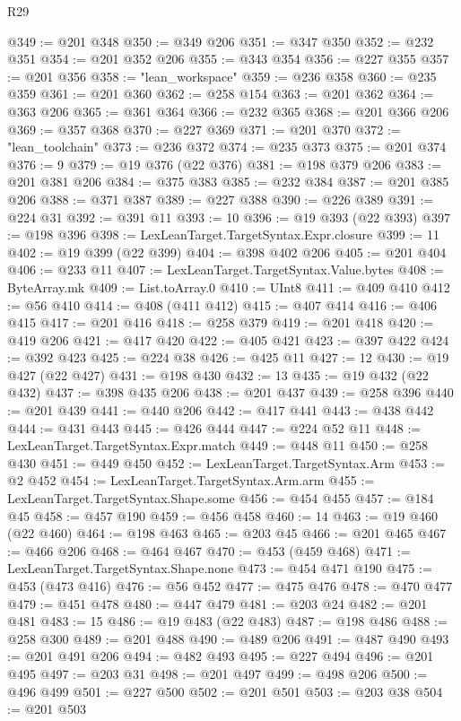 \begin{lexlean}{R29}
\begin{coremodule}
@349 := @201 @348
@350 := @349 @206
@351 := @347 @350
@352 := @232 @351
@354 := @201 @352 @206
@355 := @343 @354
@356 := @227 @355
@357 := @201 @356
@358 := "lean_workspace"
@359 := @236 @358
@360 := @235 @359
@361 := @201 @360
@362 := @258 @154
@363 := @201 @362
@364 := @363 @206
@365 := @361 @364
@366 := @232 @365
@368 := @201 @366 @206
@369 := @357 @368
@370 := @227 @369
@371 := @201 @370
@372 := "lean_toolchain"
@373 := @236 @372
@374 := @235 @373
@375 := @201 @374
@376 := 9
@379 := @19 @376 (@22 @376)
@381 := @198 @379 @206
@383 := @201 @381 @206
@384 := @375 @383
@385 := @232 @384
@387 := @201 @385 @206
@388 := @371 @387
@389 := @227 @388
@390 := @226 @389
@391 := @224 @31
@392 := @391 @11
@393 := 10
@396 := @19 @393 (@22 @393)
@397 := @198 @396
@398 := LexLeanTarget.TargetSyntax.Expr.closure
@399 := 11
@402 := @19 @399 (@22 @399)
@404 := @398 @402 @206
@405 := @201 @404
@406 := @233 @11
@407 := LexLeanTarget.TargetSyntax.Value.bytes
@408 := ByteArray.mk
@409 := List.toArray.{0}
@410 := UInt8
@411 := @409 @410
@412 := @56 @410
@414 := @408 (@411 @412)
@415 := @407 @414
@416 := @406 @415
@417 := @201 @416
@418 := @258 @379
@419 := @201 @418
@420 := @419 @206
@421 := @417 @420
@422 := @405 @421
@423 := @397 @422
@424 := @392 @423
@425 := @224 @38
@426 := @425 @11
@427 := 12
@430 := @19 @427 (@22 @427)
@431 := @198 @430
@432 := 13
@435 := @19 @432 (@22 @432)
@437 := @398 @435 @206
@438 := @201 @437
@439 := @258 @396
@440 := @201 @439
@441 := @440 @206
@442 := @417 @441
@443 := @438 @442
@444 := @431 @443
@445 := @426 @444
@447 := @224 @52 @11
@448 := LexLeanTarget.TargetSyntax.Expr.match
@449 := @448 @11
@450 := @258 @430
@451 := @449 @450
@452 := LexLeanTarget.TargetSyntax.Arm
@453 := @2 @452
@454 := LexLeanTarget.TargetSyntax.Arm.arm
@455 := LexLeanTarget.TargetSyntax.Shape.some
@456 := @454 @455
@457 := @184 @45
@458 := @457 @190
@459 := @456 @458
@460 := 14
@463 := @19 @460 (@22 @460)
@464 := @198 @463
@465 := @203 @45
@466 := @201 @465
@467 := @466 @206
@468 := @464 @467
@470 := @453 (@459 @468)
@471 := LexLeanTarget.TargetSyntax.Shape.none
@473 := @454 @471 @190
@475 := @453 (@473 @416)
@476 := @56 @452
@477 := @475 @476
@478 := @470 @477
@479 := @451 @478
@480 := @447 @479
@481 := @203 @24
@482 := @201 @481
@483 := 15
@486 := @19 @483 (@22 @483)
@487 := @198 @486
@488 := @258 @300
@489 := @201 @488
@490 := @489 @206
@491 := @487 @490
@493 := @201 @491 @206
@494 := @482 @493
@495 := @227 @494
@496 := @201 @495
@497 := @203 @31
@498 := @201 @497
@499 := @498 @206
@500 := @496 @499
@501 := @227 @500
@502 := @201 @501
@503 := @203 @38
@504 := @201 @503

\end{coremodule}
\end{lexlean}

